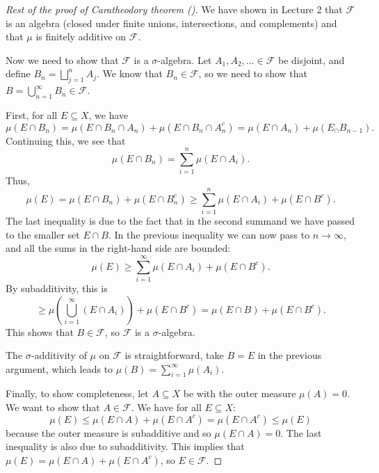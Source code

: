 \documentclass{article}
\theoremstyle{definition}
\begin{document}
\begin{proof}[Rest of the proof of Caratheodory theorem ()]
	We have shown in Lecture 2 that $\mathscr{F}$ is an algebra (closed under finite unions,
	intersections, and complements) and that $\mu$ is finitely additive on $\mathscr{F}$.

	Now we need to show that $\mathscr{F}$ is a $\sigma$-algebra. Let $A_1,A_2,\ldots\in \mathscr{F} $
	be disjoint, and define $B_n=\bigsqcup_{j=1}^{n}A_j$.
	We know that $B_n\in \mathscr{F}$,
	so we need to show that $B=\bigcup_{n=1}^{\infty}B_n\in \mathscr{F}$.

	First, for all $E\subseteq X$, we have
	\begin{equation*}
		\mu(E\cap B_n)=\mu(E\cap B_n\cap A_n)+\mu(E\cap B_n\cap A_n^c)
		=
		\mu(E\cap A_n)+\mu(E_\cap B_{n-1}).
	\end{equation*}
	Continuing this, we see that 
	\begin{equation*}
		\mu(E\cap B_n)=\sum_{i=1}^{n}\mu(E\cap A_i).
	\end{equation*}
	Thus, 
	\begin{equation*}
		\mu(E)=\mu(E\cap B_n)+\mu(E\cap B_n^c)\ge \sum_{i=1}^{n}\mu(E\cap A_i)+\mu(E\cap B^c).
	\end{equation*}
	The last inequality is due to the fact that in the second summand 
	we have passed to the smaller set $E\cap B$.
	In the previous inequality we can now pass to $n\to\infty$, and all the sums in the 
	right-hand side are bounded:
	\begin{equation*}
		\mu(E)\ge \sum_{i=1}^{\infty}\mu(E\cap A_i)+\mu(E\cap B^c).
	\end{equation*}
	By subadditivity, this is 
	\begin{equation*}
		\ge \mu\left( \bigcup_{i=1}^{\infty}(E\cap A_i) \right)+\mu(E\cap B^c)
		=\mu(E\cap B)+\mu(E\cap B^c).
	\end{equation*}
	This shows that $B\in \mathscr{F}$, so $\mathscr{F}$ is a $\sigma$-algebra.

	The $\sigma$-additivity of $\mu$ on $\mathscr{F}$ is straightforward, take $B=E$ in the previous
	argument, which leads to $\mu(B)=\sum_{i=1}^{\infty}\mu(A_i)$.

	Finally, to show completeness, let $A\subseteq X$ be with the outer measure $\mu(A)=0$.
	We want to show that $A\in \mathscr{F}$.
	We have for all $E\subseteq X$:
	\begin{equation*}
		\mu(E)\le \mu(E\cap A)+\mu(E\cap A^c)=\mu(E\cap A^c)\le \mu(E)
	\end{equation*}
	because the outer measure is subadditive and so $\mu(E\cap A)=0$.
	The last inequality is also due to subadditivity.
	This implies that $\mu(E)=\mu(E\cap A)+\mu(E\cap A^c)$, 
	so $E\in \mathscr{F}$.
\end{proof}
\end{document}
